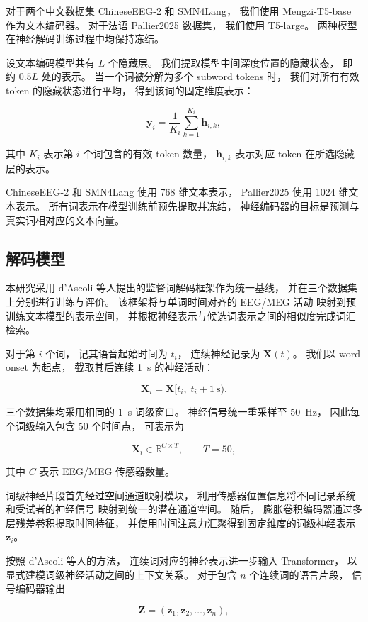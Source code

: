 对于两个中文数据集 ChineseEEG-2 和 SMN4Lang，
我们使用 Mengzi-T5-base 作为文本编码器。
对于法语 Pallier2025 数据集，
我们使用 T5-large。
两种模型在神经解码训练过程中均保持冻结。

设文本编码模型共有 $L$ 个隐藏层。
我们提取模型中间深度位置的隐藏状态，
即约 $0.5L$ 处的表示。
当一个词被分解为多个 subword tokens 时，
我们对所有有效 token 的隐藏状态进行平均，
得到该词的固定维度表示：

\[
\mathbf{y}_i =
\frac{1}{K_i}
\sum_{k=1}^{K_i}
\mathbf{h}_{i,k},
\]

其中 $K_i$ 表示第 $i$ 个词包含的有效 token 数量，
$\mathbf{h}_{i,k}$ 表示对应 token 在所选隐藏层的表示。

ChineseEEG-2 和 SMN4Lang 使用 768 维文本表示，
Pallier2025 使用 1024 维文本表示。
所有词表示在模型训练前预先提取并冻结，
神经编码器的目标是预测与真实词相对应的文本向量。

\subsection{解码模型}

本研究采用 d'Ascoli 等人提出的监督词解码框架作为统一基线，
并在三个数据集上分别进行训练与评价。
该框架将与单词时间对齐的 EEG/MEG 活动
映射到预训练文本模型的表示空间，
并根据神经表示与候选词表示之间的相似度完成词汇检索。

对于第 $i$ 个词，
记其语音起始时间为 $t_i$，
连续神经记录为 $\mathbf{X}(t)$。
我们以 word onset 为起点，
截取其后连续 1~s 的神经活动：

\[
\mathbf{X}_i
=
\mathbf{X}[t_i,\;t_i+1~\mathrm{s}).
\]

三个数据集均采用相同的 1~s 词级窗口。
神经信号统一重采样至 50~Hz，
因此每个词级输入包含 50 个时间点，
可表示为

\[
\mathbf{X}_i\in\mathbb{R}^{C\times T},
\qquad T=50,
\]

其中 $C$ 表示 EEG/MEG 传感器数量。

词级神经片段首先经过空间通道映射模块，
利用传感器位置信息将不同记录系统和受试者的神经信号
映射到统一的潜在通道空间。
随后，
膨胀卷积编码器通过多层残差卷积提取时间特征，
并使用时间注意力汇聚得到固定维度的词级神经表示
$\mathbf{z}_i$。

按照 d'Ascoli 等人的方法，
连续词对应的神经表示进一步输入 Transformer，
以显式建模词级神经活动之间的上下文关系。
对于包含 $n$ 个连续词的语言片段，
信号编码器输出

\[
\mathbf{Z}
=
(\mathbf{z}_1,\mathbf{z}_2,\ldots,\mathbf{z}_n),
\]

